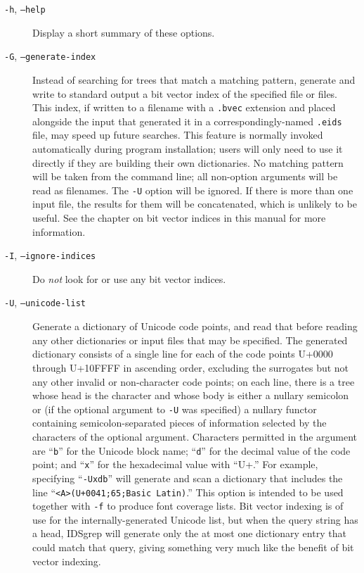 \documentclass[twocolumn]{report}
\newcommand{\DangerousBend}{\marginpar{\large\hfill\dbend\hfill\null}}
\begin{document}
\begin{description}
\item[\texttt{-h}, \texttt{--help}] Display a short summary of these
options.

\item[\texttt{-G}, \texttt{--generate-index}]
Instead \DangerousBend of searching for trees that match a matching
pattern, generate and
write to standard output a bit vector index of the specified file or files.
This index, if written to a filename with a \texttt{.bvec} extension and
placed alongside the input that generated it in a correspondingly-named
\texttt{.eids} file, may speed up future searches.
This feature is normally invoked automatically during program installation;
users will only need to use it directly if they are building their own
dictionaries.  No
matching pattern will be taken from the command line; all non-option
arguments will be read as filenames.  The \texttt{-U} option will be
ignored.  If there is more than one input file, the results for them will be
concatenated, which is unlikely to be useful.  See the chapter on bit vector
indices in this manual for more information.

\item[\texttt{-I}, \texttt{--ignore-indices}]
Do \emph{not} look for or use any bit vector indices.

\item[\texttt{-U}, \texttt{--unicode-list}] Generate a dictionary of Unicode
code points, and read that before reading any other dictionaries or input
files that may be specified.  The generated dictionary consists of a single
line for each of the code points U+0000 through U+10FFFF in ascending order,
excluding the surrogates but not any other invalid or non-character code
points; on each line, there is a tree whose head is the character and whose
body is either a nullary semicolon or (if the optional argument to
\texttt{-U} was specified) a nullary functor containing semicolon-separated
pieces of information selected by the characters of the optional argument. 
Characters permitted in the argument are ``\texttt{b}'' for the Unicode
block name; ``\texttt{d}'' for the decimal value of the code point; and
``\texttt{x}'' for the hexadecimal value with ``U+.'' For example,
specifying ``\texttt{-Uxdb}'' will generate and scan a dictionary that
includes the line ``\texttt{<A>(U+0041;65;Basic Latin)}.'' This option is
intended to be used together with \texttt{-f} to produce font coverage
lists.  Bit vector indexing is of use for the internally-generated
Unicode list, but when the query string has a head, IDSgrep will generate
only the at most one dictionary entry that could match that query, giving
something very much like the benefit of bit vector indexing.


\end{description}
\end{document}
